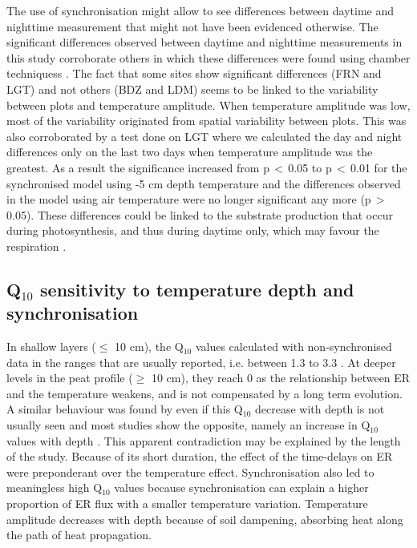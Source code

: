 The use of synchronisation might allow to see differences between daytime and nighttime measurement that might not have been evidenced otherwise.
The significant differences observed between daytime and nighttime measurements in this study corroborate others in which these differences were found using chamber techniquess \citep{juszczak2012,darenova2014}.
The fact that some sites show significant differences (FRN and LGT) and not others (BDZ and LDM) seems to be linked to the variability between plots and temperature amplitude.
When temperature amplitude was low, most of the variability originated from spatial variability between plots.
This was also corroborated by a test done on LGT where we calculated the day and night differences only on the last two days when temperature amplitude was the greatest.
As a result the significance increased from p\,$<$\,0.05 to p\,$<$\,0.01 for the synchronised model using -5 cm depth temperature and the differences observed in the model using air temperature were no longer significant any more (p\,$>$\,0.05).
These differences could be linked to the substrate production that occur during photosynthesis, and thus during daytime only, which may favour the respiration \citep{weedon2013}.

\subsection{Q$_{10}$ sensitivity to temperature depth and synchronisation}

In shallow layers ($\leq$ 10 cm), the Q$_{10}$ values calculated with non-synchronised data in the ranges that are usually reported, i.e. between 1.3 to 3.3 \citep{raich1992}.
At deeper levels in the peat profile ($\geq$ 10 cm), they reach 0 as the relationship between ER and the temperature weakens, and is not compensated by a long term evolution.
A similar behaviour was found by \citet{pavelka2007} even if this Q$_{10}$ decrease with depth is not usually seen and most studies show the opposite, namely an increase in Q$_{10}$ values with depth \citep{graf2008}.
This apparent contradiction may be explained by the length of the study.
Because of its short duration, the effect of the time-delays on ER were preponderant over the temperature effect.
Synchronisation also led to meaningless high Q$_{10}$ values because synchronisation can explain a higher proportion of ER flux with a smaller temperature variation.
Temperature amplitude decreases with depth because of soil dampening, absorbing heat along the path of heat propagation.


